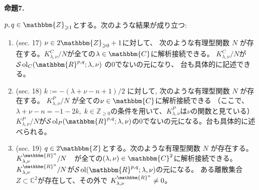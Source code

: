 \documentclass[a4paper,10pt]{article} %
\newcommand{\assign}{:=}
\newcommand{\tmop}[1]{\ensuremath{\operatorname{#1}}}
\newcommand{\tmtextbf}[1]{{\bfseries{#1}}}
\newcommand{\tmtextit}[1]{{\itshape{#1}}}
\begin{document}
{\noindent}\tmtextbf{命題\textbf{7}.} \tmtextit{$p, q \in
 \mathbbm{Z}_{\geqslant 1}$とする。次のような結果が成り立つ:
\begin{enumerate}
 \item (sec. 17) $\nu \in 2\mathbbm{Z}_{\geqslant 0}+1$に対して、 次のような有理型関数 $N$ が存在する。$K_{\lambda, \nu}^C / N$が全ての$\lambda \in \mathbbm{C}$に解析接続できる。
 $K_{\lambda, \nu}^C / N$が$\mathcal{S} \tmop{ol}_C ( \mathbbm{R}^{p, q} ; \lambda, \nu)$ の0でないの元になり、
 台も具体的に記述できる。
 
 \item (sec. 18) $k \assign - ( \lambda + \nu - n + 1) / 2$
に対して, 次のような有理型関数 $N$ が存在する。
$K_{\lambda, \nu}^P / N$
が全ての$\nu\in \mathbbm{C}$に解析接続できる 
（ここで、$\lambda+\nu-n=-1-2k,\;k\in\mathbb{Z}_{\ge0}$の条件を用いて、$K_{\lambda, \nu}^P$は$\nu$の関数と見ている）
$K_{\lambda, \nu}^P / N$が$\mathcal{S}\tmop{ol}_P ( \mathbbm{R}^{p, q} ;
 \lambda, \nu)$の0でないの元になる。台も具体的に述べられる。
 
 \item (sec. 19) $q \in 2\mathbbm{Z}$とする。次のような有理型関数 $N$ が存在する。$K_{\lambda, \nu}^{\mathbbm{R}^n} / N$　が全ての$(\lambda,\nu) \in \mathbbm{C}^2$に解析接続できる。
$K_{\lambda, \nu}^{\mathbbm{R}^n} / N$が$\mathcal{S}\tmop{ol} ( \mathbbm{R}^{p, q} ;
 \lambda, \nu)$の元になる。
 ある離散集合$Z\subset\mathbb{C}^2$が存在して、その外で
 $K_{\lambda, \nu}^{\mathbbm{R}^n}\neq0$。
\end{enumerate}}{\hspace*{\fill}}{\medskip}
\end{document}
